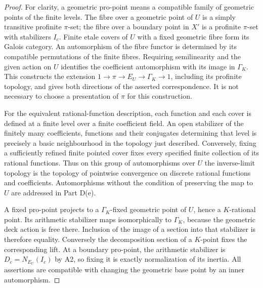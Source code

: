 \begin{proof}
For clarity, a geometric pro-point means a compatible family of geometric points of the finite levels. The fibre over a geometric point of $U$ is a simply transitive profinite $\pi$-set; the fibre over a boundary point in $X'$ is a profinite $\pi$-set with stabilizers $I_c$. Finite etale covers of $U$ with a fixed geometric fibre form its Galois category. An automorphism of the fibre functor is determined by its compatible permutations of the finite fibres. Requiring semilinearity and the given action on $U$ identifies the coefficient automorphism with its image in $\Gamma_K$. This constructs the extension $1\to\pi\to E_U\to\Gamma_K\to1$, including its profinite topology, and gives both directions of the asserted correspondence. It is not necessary to choose a presentation of $\pi$ for this construction.

For the equivalent rational-function description, each function and each cover is defined at a finite level over a finite coefficient field. An open stabilizer of the finitely many coefficients, functions and their conjugates determining that level is precisely a basic neighbourhood in the topology just described. Conversely, fixing a sufficiently refined finite pointed cover fixes every specified finite collection of its rational functions. Thus on this group of automorphisms over $U$ the inverse-limit topology is the topology of pointwise convergence on discrete rational functions and coefficients. Automorphisms without the condition of preserving the map to $U$ are addressed in Part D(e).

A fixed pro-point projects to a $\Gamma_K$-fixed geometric point of $U$, hence a $K$-rational point. Its arithmetic stabilizer maps isomorphically to $\Gamma_K$, because the geometric deck action is free there. Inclusion of the image of a section into that stabilizer is therefore equality. Conversely the decomposition section of a $K$-point fixes the corresponding lift. At a boundary pro-point, the arithmetic stabilizer is $D_c=N_{E_U}(I_c)$ by A2, so fixing it is exactly normalization of its inertia. All assertions are compatible with changing the geometric base point by an inner automorphism.
\end{proof}

